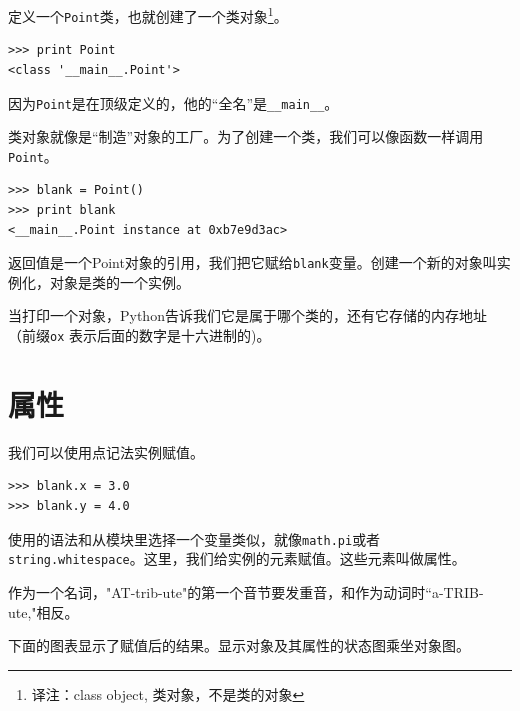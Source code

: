 
定义一个{\tt Point}类，也就创建了一个类对象\footnote{译注：class object, 类对象，不是类的对象}。

\beforeverb
\begin{verbatim}
>>> print Point
<class '__main__.Point'>
\end{verbatim}
\afterverb
%

因为{\tt Point}是在顶级定义的，他的“全名”是\verb"__main__"。



类对象就像是“制造”对象的工厂。为了创建一个类，我们可以像函数一样调用
{\tt Point}。

\beforeverb
\begin{verbatim}
>>> blank = Point()
>>> print blank
<__main__.Point instance at 0xb7e9d3ac>
\end{verbatim}
\afterverb
%

返回值是一个Point对象的引用，我们把它赋给{\tt blank}变量。创建一个新的对象叫实例化，对象是类的一个实例。


当打印一个对象，Python告诉我们它是属于哪个类的，还有它存储的内存地址
（前缀{\tt ox} 表示后面的数字是十六进制的)。


\section{属性}


我们可以使用点记法实例赋值。

\beforeverb
\begin{verbatim}
>>> blank.x = 3.0
>>> blank.y = 4.0
\end{verbatim}
\afterverb
%

 使用的语法和从模块里选择一个变量类似，就像{\tt math.pi}或者{\tt string.whitespace}。这里，我们给实例的元素赋值。这些元素叫做属性。

 作为一个名词，"AT-trib-ute"的第一个音节要发重音，和作为动词时“a-TRIB-ute,"相反。

 下面的图表显示了赋值后的结果。显示对象及其属性的状态图乘坐对象图。


